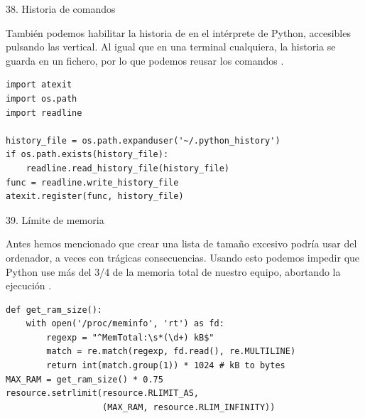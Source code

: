 \documentclass[14pt]{beamer}
\begin{document}
\begin{frame}[fragile]{38. Historia de comandos}
  \small
  \begin{block}{}
    \centering
    También podemos habilitar la historia de  en el intérprete de Python, accesibles pulsando
    las  vertical. Al igual que en una
    terminal cualquiera, la historia se guarda en un fichero, por lo
    que podemos reusar los comandos .
  \end{block}

  \footnotesize
  \begin{exampleblock}{}
    \begin{lstlisting}
import atexit
import os.path
import readline

history_file = os.path.expanduser('~/.python_history')
if os.path.exists(history_file):
    readline.read_history_file(history_file)
func = readline.write_history_file
atexit.register(func, history_file)
    \end{lstlisting}
  \end{exampleblock}
\end{frame}

\begin{frame}[fragile]{39. Límite de memoria}
  \small
  \begin{block}{}
    \centering
    Antes hemos mencionado que crear una lista de tamaño excesivo
    podría usar  del ordenador, a veces con
    trágicas consecuencias. Usando esto podemos impedir que Python use
    más del 3/4 de la memoria total de nuestro equipo, abortando la
    ejecución .
  \end{block}

  \scriptsize
  \begin{exampleblock}{}
    \begin{lstlisting}
def get_ram_size():
    with open('/proc/meminfo', 'rt') as fd:
        regexp = "^MemTotal:\s*(\d+) kB$"
        match = re.match(regexp, fd.read(), re.MULTILINE)
        return int(match.group(1)) * 1024 # kB to bytes
MAX_RAM = get_ram_size() * 0.75
resource.setrlimit(resource.RLIMIT_AS,
                   (MAX_RAM, resource.RLIM_INFINITY))
    \end{lstlisting}
  \end{exampleblock}
\end{frame}
\end{document}

